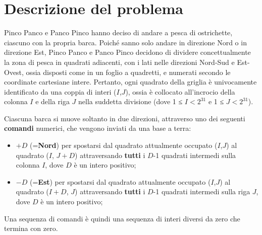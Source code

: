 \documentclass[a4paper,11pt]{article}
\begin{document}
\vspace{0.5cm}



\vspace{0.5cm}

\section*{Descrizione del problema}
  
Pinco Panco e Panco Pinco hanno deciso di andare a pesca di
ostrichette, ciascuno con la propria barca.
Poiché sanno solo andare in direzione Nord o in direzione Est,
Pinco Panco e Panco Pinco decidono di dividere concettualmente la zona
di pesca in quadrati adiacenti, con i lati nelle direzioni Nord-Sud e
Est-Ovest, ossia disposti come in un foglio a quadretti, e numerati
secondo le coordinate cartesiane intere. Pertanto, ogni quadrato della
griglia è univocamente identificato da una coppia di interi
($I$,$J$), ossia è collocato all'incrocio
della colonna $I$ e della riga $J$ nella suddetta
divisione (dove 1 ≤ $I < 2^{31}$ e 1 ≤
$J < 2^{31}$).

Ciascuna barca si muove soltanto in due direzioni, attraverso uno dei
seguenti \textbf{comandi} numerici, che vengono inviati da una base a
terra:

\begin{itemize}
  
    \item $+D$ (=\textbf{Nord}) per spostarsi dal quadrato
attualmente occupato ($I$,$J$) al quadrato
($I$, $J+D$) attraversando \textbf{tutti} i
$D$-1 quadrati intermedi sulla colonna $I$, dove
$D$ è un intero positivo;
    \item $-D$ (=\textbf{Est}) per spostarsi dal quadrato
attualmente occupato ($I$,$J$) al quadrato
($I+D$, $J$) attraversando \textbf{tutti} i
$D$-1 quadrati intermedi sulla riga $J$, dove
$D$ è un intero positivo;
\end{itemize}

Una sequenza di comandi è quindi una sequenza di interi diversi
da zero che termina con zero.
\end{document}
